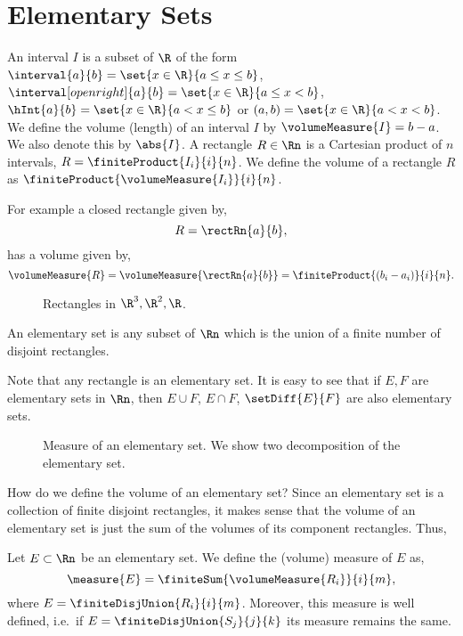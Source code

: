 \section{Elementary Sets}
\begin{Definition}[name= Intervals and rectangles]
    An interval $I$ is a subset of $\R$ of the form $\interval{a}{b} = \set{x\in\R}{a\leq x \leq b}$,
    $\interval[open right]{a}{b} = 
    \set{x\in\R}{a\leq x < b}$, $\hInt{a}{b} = \set{x\in\R}{a < x \leq b}$ or $(a,b)
    = \set{x\in\R}{a < x < b}$. We define the volume (length) of an interval $I$ by $\volumeMeasure{I} = b-a$. 
    We also denote this by $\abs{I}$.
    A rectangle $R \in \Rn $ is a Cartesian product of $n$ intervals, $R = \finiteProduct{I_i}{i}{n}$. We
    define the volume of a rectangle $R$ as $\finiteProduct{\volumeMeasure{I_i}}{i}{n}$. 
\end{Definition}
For example a closed rectangle given by,
\[R = \rectRn{a}{b},\]
has a volume given by,
\[\volumeMeasure{R} = \volumeMeasure{\rectRn{a}{b}} = \finiteProduct{(b_i-a_i)}{i}{n}.\]


\begin{figure}
    
    \caption{Rectangles in $\R^3,\R^2,\R$.}\label{fig:tikz:rectangle_in_rn}
\end{figure}

\begin{Definition}[name=Elementary set]
    An elementary set is any subset of $\Rn$ which is the union of a finite number of disjoint rectangles.
\end{Definition}
Note that any rectangle is an elementary set. It is easy to see that if $E,F$ are elementary sets in $\Rn$, then $E\cup F$, $E\cap F$, $\setDiff{E}{F}$ are
also elementary sets.
\begin{figure}
    
    \caption{Measure of an elementary set. We show two decomposition of 
	the elementary set.}\label{fig:tikz:meas_elem_set}
\end{figure}
How do we define the volume of an elementary set? Since an elementary set is a collection of finite disjoint
rectangles, it makes sense that the volume
of an elementary set is just the sum of the volumes of its component rectangles. Thus,
\begin{Theorem}[name=Measure of an elementary set]\label{thm:meas_elem_set}
    Let $E\subset\Rn$ be an elementary set. We define the (volume) measure of $E$ as,
    \[\measure{E} = \finiteSum{\volumeMeasure{R_i}}{i}{m},\]
    where $E = \finiteDisjUnion{R_i}{i}{m}$. Moreover, this measure is well defined, i.e.~if $E =
    \finiteDisjUnion{S_j}{j}{k}$ its measure remains the same.
\end{Theorem}

